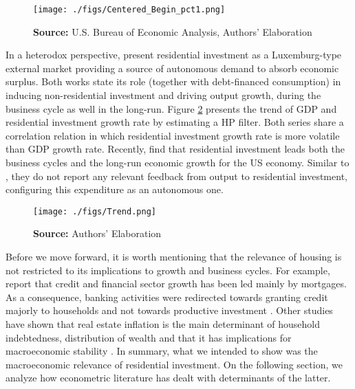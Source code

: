 \documentclass[12pt, a4paper]{article}
\begin{document}
\begin{figure}[H]
	\centering
	\caption{Selected expecditure growth rates 2 years before and after recession start\\Dashed lines indicates recession start (NBER recession dating procedure)}
	\label{fig:cycle}
	\texttt{[image: ./figs/Centered\_Begin\_pct1.png]}
	\caption*{\textbf{Source:} U.S. Bureau of Economic Analysis, Authors' Elaboration}
\end{figure}


In a heterodox perspective, \textcites{fiebiger_semi-autonomous_2018}{fiebiger_trend_2017} present residential investment as a Luxemburg-type external market providing a source of autonomous demand to absorb economic surplus.
Both works state its role (together with debt-financed consumption) in inducing non-residential investment and driving output growth, during the business cycle as well in the long-run.
Figure \ref{fig:trend} presents the trend of GDP and residential investment growth rate by estimating a HP filter.
Both series share a correlation relation in which residential investment growth rate is more volatile than GDP growth rate.
Recently, \textcite{perez_Montiel_2021} find that residential investment leads both the business cycles and the long-run economic growth for the US economy.
Similar to \textcite{girardi_long-run_2016}, they do not report any relevant feedback from output to residential investment, configuring this expenditure as an autonomous one.

\begin{figure}[H]
	\centering
	\caption{GDP and Residential investment growth rate tred (HP filter, $\lambda = 1600$)}
	\label{fig:trend}
	\texttt{[image: ./figs/Trend.png]}
	\caption*{\textbf{Source:} Authors' Elaboration}
\end{figure}


Before we move forward, it is worth mentioning that the relevance of housing is not restricted to its implications to growth and business cycles.
For example, \textcite{jorda_great_2016} report that credit and financial sector growth has been led mainly by mortgages. 
As a consequence, banking activities were redirected towards granting credit majorly to households and not towards productive investment \cites{erturk_banks_2007}{kohl_more_2018}.
Other studies have shown that real estate inflation is the main determinant of household indebtedness, distribution of wealth and that it has implications for macroeconomic stability \cites{ryoo_household_2015}{stockhammer_debt-driven_2016}{barnes_private_2016}{johnston_global_2017}{mian_household_2017}{anderson_politics_2020}{fuller_housing_2020}. 
In summary, what we intended to show was the macroeconomic relevance of residential investment.
On the following section, we analyze how econometric literature has dealt with determinants of the latter.
\end{document}
